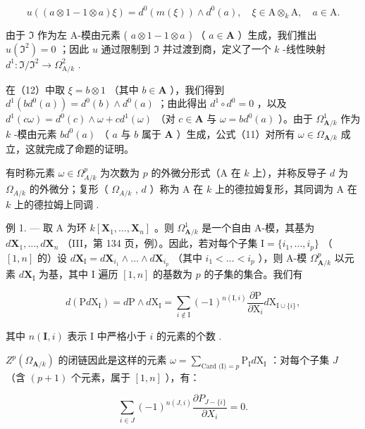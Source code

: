 \[
u ((a \otimes 1 - 1 \otimes a) \xi) = d ^ {0} (m (\xi)) \wedge d ^ {0} (a), \quad \xi \in \mathrm{A} \otimes_ {k} \mathrm{A}, \quad a \in \mathrm{A}. \tag {12}
\]

由于 \(\mathfrak{I}\) 作为左 A-模由元素 ( \(a \otimes 1 - 1 \otimes a\) ) （ \(a \in \mathbf{A}\) ）生成，我们推出 \(u(\mathfrak{I}^2) = 0\) ；因此 \(u\) 通过限制到 \(\mathfrak{I}\) 并过渡到商，定义了一个 \(k\) -线性映射 \(d^1: \mathfrak{I}/\mathfrak{I}^2 \to \Omega_{\mathrm{A}/k}^2\) .

在（12）中取 \(\xi = b \otimes 1\) （其中 \(b \in \mathbf{A}\) ），我们得到 \(d^{1}(bd^{0}(a)) = d^{0}(b) \wedge d^{0}(a)\) ；由此得出 \(d^{1} \circ d^{0} = 0\) ，以及 \(d^{1}(c\omega) = d^{0}(c) \wedge \omega + cd^{1}(\omega)\) （对 \(c \in \mathbf{A}\) 与 \(\omega = bd^{0}(a)\) ）。由于 \(\Omega_{\mathbf{A}/k}^{1}\) 作为 \(k\) -模由元素 \(bd^{0}(a)\) （ \(a\) 与 \(b\) 属于 \(\mathbf{A}\) ）生成，公式（11）对所有 \(\omega \in \Omega_{\mathbf{A}/k}\) 成立，这就完成了命题的证明。

有时称元素 \(\omega\in\Omega_{A/k}^{p}\) 为次数为 \(p\) 的外微分形式（A 在 \(k\) 上），并称反导子 \(d\) 为 \(\Omega_{A/k}\) 的外微分；复形（ \(\Omega_{A/k}\) , \(d\) ）称为 A 在 \(k\) 上的德拉姆复形，其同调为 A 在 \(k\) 上的德拉姆上同调 .

例 1. --- 取 A 为环 \(k[\mathbf{X}_{1},\ldots,\mathbf{X}_{n}]\) 。则 \(\Omega_{\mathbf{A}/k}^{1}\) 是一个自由 A-模，其基为 \(d\mathbf{X}_{1},\ldots,d\mathbf{X}_{n}\) （III，第 134 页，例）。因此，若对每个子集 \(\mathrm{I}=\{i_{1},\ldots,i_{p}\}\) （ \([1,n]\) 的）设 \(d\mathbf{X}_{\mathrm{I}}=d\mathbf{X}_{i_{1}}\wedge\ldots\wedge d\mathbf{X}_{i_{p}}\) （其中 \(i_{1}<\ldots<i_{p}\) ），则 A-模 \(\Omega_{\mathbf{A}/k}^{p}\) 以元素 \(d\mathbf{X}_{\mathrm{I}}\) 为基，其中 I 遍历 \([1,n]\) 的基数为 \(p\) 的子集的集合。我们有

\[
d (\mathrm{P} d \mathrm{X} _ {\mathrm{I}}) = d \mathrm{P} \wedge d \mathrm{X} _ {\mathrm{I}} = \sum_ {i \notin \mathrm{I}} (- 1) ^ {n (\mathrm{I}, i)} \frac {\partial \mathrm{P}}{\partial \mathrm{X} _ {i}} d \mathrm{X} _ {\mathrm{I} \cup \{i \}},
\]

其中 \(n(\mathbf{I}, i)\) 表示 I 中严格小于 \(i\) 的元素的个数 .

\(Z^{p}(\Omega_{\mathbf{A}/k})\) 的闭链因此是这样的元素 \(\omega = \sum_{\text{Card (I)} = p} \mathrm{P}_{\mathrm{I}} d\mathrm{X}_{\mathrm{I}}\) ：对每个子集 \(J\) （含 \((p + 1)\) 个元素，属于 \([1, n]\) ），有：

\[
\sum_ {i \in J} (- 1) ^ {n (J, i)} \frac {\partial P _ {J - \{i \}}}{\partial X _ {i}} = 0.
\]

